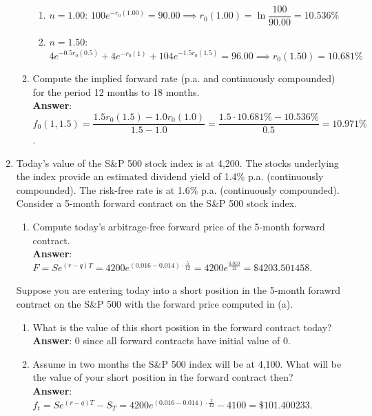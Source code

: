 \documentclass{article}
\begin{document}
\begin{enumerate}
\begin{enumerate}
\begin{enumerate}
                              \item $n=1.00$: $100e^{-r_0(1.00)}=90.00\implies r_0(1.00)=\ln\dfrac{100}{90.00}=10.536\%$
                              \item $n=1.50$: $4e^{-0.5r_0(0.5)}+4e^{-r_0(1)}+104e^{-1.5r_0(1.5)}=96.00\implies r_0(1.50)=10.681\%$
                        \end{enumerate}
                  \item Compute the implied forward rate (p.a. and continuously compounded) for the period 12 months to 18 months.\\
                        \textbf{Answer}: $f_0(1,1.5)=\dfrac{1.5r_0(1.5)-1.0r_0(1.0)}{1.5-1.0}=\dfrac{1.5\cdot 10.681\%-10.536\%}{0.5}=10.971\%$.
            \end{enumerate}
            \newpage
      \item Today's value of the S\&P 500 stock index is at 4,200. The stocks underlying the index provide an estimated dividend yield of 1.4\% p.a. (continuously compounded). The risk-free rate is at 1.6\% p.a. (continuously compounded).\\Consider a 5-month forward contract on the S\&P 500 stock index.
            \begin{enumerate}
                  \item Compute today's arbitrage-free forward price of the 5-month forward contract.\\
                        \textbf{Answer}: $F=Se^{(r-q)T}=4200e^{(0.016-0.014)\cdot\frac{5}{12}}=4200e^{\frac{0.010}{12}}=\$4203.501458$.
            \end{enumerate}
            Suppose you are entering today into a short position in the 5-month forawrd contract on the S\&P 500 with the forward price computed in (a).
            \begin{enumerate}[resume]
                  \item What is the value of this short position in the forward contract today?\\
                        \textbf{Answer}: $0$ since all forward contracts have initial value of $0$.
                  \item Assume in two months the S\&P 500 index will be at 4,100. What will be the value of your short position in the forward contract then?\\
                        \textbf{Answer}: $f_t=Se^{(r-q)T}-S_T=4200e^{(0.016-0.014)\cdot\frac{2}{12}}-4100=\$101.400233$.
            \end{enumerate}

\end{enumerate}
\end{document}
